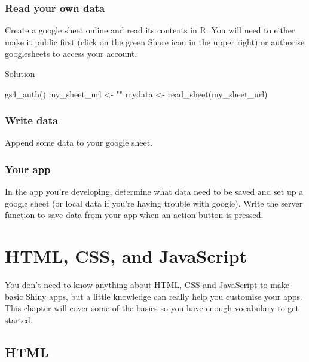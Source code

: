 \documentclass[
]{book}
\newenvironment{Shaded}{\begin{snugshade}}{\end{snugshade}}
\newcommand{\FunctionTok}[1]{\textcolor[rgb]{0.00,0.00,0.00}{#1}}
\newcommand{\NormalTok}[1]{#1}
\newcommand{\OtherTok}[1]{\textcolor[rgb]{0.56,0.35,0.01}{#1}}
\newcommand{\StringTok}[1]{\textcolor[rgb]{0.31,0.60,0.02}{#1}}
\begin{document}
\hypertarget{read-your-own-data}{%
\subsection{Read your own data}\label{read-your-own-data}}

Create a google sheet online and read its contents in R. You will need to either make it public first (click on the green Share icon in the upper right) or authorise googlesheets to access your account.

Solution

\begin{Shaded}
\begin{Highlighting}[]
\FunctionTok{gs4\_auth}\NormalTok{()}
\NormalTok{my\_sheet\_url }\OtherTok{\textless{}{-}} \StringTok{""}
\NormalTok{mydata }\OtherTok{\textless{}{-}} \FunctionTok{read\_sheet}\NormalTok{(my\_sheet\_url)}
\end{Highlighting}
\end{Shaded}

\hypertarget{write-data}{%
\subsection{Write data}\label{write-data}}

Append some data to your google sheet.

\hypertarget{your-app-1}{%
\subsection{Your app}\label{your-app-1}}

In the app you're developing, determine what data need to be saved and set up a google sheet (or local data if you're having trouble with google). Write the server function to save data from your app when an action button is pressed.

\hypertarget{web}{%
\chapter{HTML, CSS, and JavaScript}\label{web}}

You don't need to know anything about HTML, CSS and JavaScript to make basic Shiny apps, but a little knowledge can really help you customise your apps. This chapter will cover some of the basics so you have enough vocabulary to get started.

\hypertarget{html}{%
\section{HTML}\label{html}}
\end{document}
